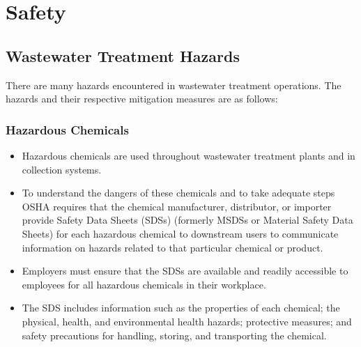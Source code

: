\chapter{Safety}



\section{Wastewater Treatment Hazards}
There are many hazards encountered in wastewater treatment operations.  The hazards and their respective mitigation measures are as follows:\\
\subsection{Hazardous Chemicals}
\begin{itemize}
\item Hazardous chemicals are used throughout wastewater treatment plants and in collection systems. 
\item To understand the dangers of these chemicals and to take adequate steps OSHA requires that the chemical manufacturer, distributor, or importer provide Safety Data Sheets (SDSs) (formerly MSDSs or Material Safety Data Sheets) for each hazardous chemical to downstream users to communicate information on hazards related to that particular chemical or product.
\item Employers must ensure that the SDSs are available and readily accessible to employees for all hazardous chemicals in their workplace.
\item The SDS includes information such as the properties of each chemical; the physical, health, and environmental health hazards; protective measures; and safety precautions for handling, storing, and transporting the chemical.\\
\end{itemize}


